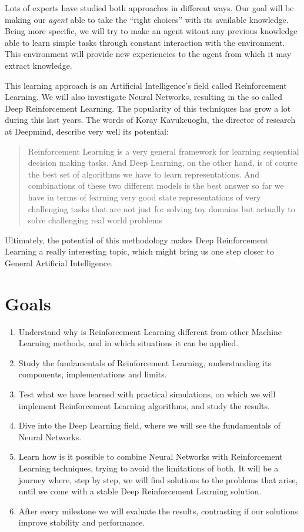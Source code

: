Lots of experts have studied both approaches in different ways. Our goal will be making our \textit{agent} able to take the ``right choices'' with its available knowledge. Being more specific, we will try to make an agent witout any previous knowledge able to learn simple tasks through constant interaction with the environment. This environment will provide new experiencies to the agent from which it may extract knowledge.

This learning approach is an Artificial Intelligence's field called Reinforcement Learning. We will also investigate Neural Networks, resulting in the so called Deep Reinforcement Learning. The popularity of this techniques has grow a lot during this last years. The words of Koray Kavukcuoglu, the director of research at Deepmind, describe very well its potential:

\begin{quote}
    Reinforcement Learning is a very general framework for learning sequential decision making tasks. And Deep Learning, on the other hand, is of course the best set of algorithms we have to learn representations. And combinations of these two different models is the best answer so far we have in terms of learning very good state representations of very challenging tasks that are not just for solving toy domains but actually to solve challenging real world problems
\end{quote}

Ultimately, the potential of this methodology makes Deep Reinforcement Learning a really interesting topic, which might bring us one step closer to General Artificial Intelligence.


\section{Goals}

\begin{enumerate}
    \item Understand why is Reinforcement Learning different from other Machine Learning methods, and in which situations it can be applied.
    \item Study the fundamentals of Reinforcement Learning, understanding its components, implementations and limits.
    \item Test what we have learned with practical simulations, on which we will implement Reinforcement Learning algorithms, and study the results.
    \item Dive into the Deep Learning field, where we will see the fundamentals of Neural Networks.
    \item Learn how is it possible to combine Neural Networks with Reinforcement Learning techniques, trying to avoid the limitations of both. It will be a journey where, step by step, we will find solutions to the problems that arise, until we come with a stable Deep Reinforcement Learning solution.
    \item After every milestone we will evaluate the results, contrasting if our solutions improve stability and performance.
\end{enumerate}


